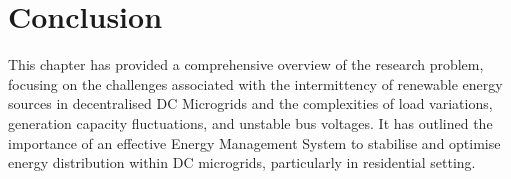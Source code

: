 \section{Conclusion}
This chapter has provided a comprehensive overview of the research problem, focusing on the challenges associated with the intermittency of renewable energy sources in decentralised DC Microgrids and the complexities of load variations, generation capacity fluctuations, and unstable bus voltages. It has outlined the importance of an effective Energy Management System to stabilise and optimise energy distribution within DC microgrids, particularly in residential setting. 